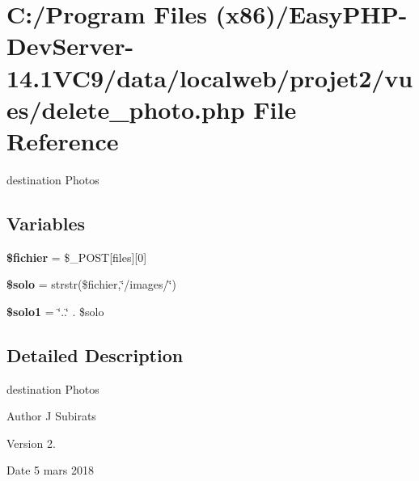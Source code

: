 \hypertarget{delete__photo_8php}{}\section{C\+:/\+Program Files (x86)/\+Easy\+P\+H\+P-\/\+Dev\+Server-\/14.1\+V\+C9/data/localweb/projet2/vues/delete\+\_\+photo.php File Reference}
\label{delete__photo_8php}


destination Photos  


\subsection*{Variables}
\begin{DoxyCompactItemize}
\item 
\mbox{\label{delete__photo_8php_a1cab83481bc861b32af8f093a199c35e}} 
{\bfseries \$fichier} = \$\+\_\+\+P\+O\+ST\mbox{[}\textquotesingle{}files\textquotesingle{}\mbox{]}\mbox{[}0\mbox{]}
\item 
\mbox{\label{delete__photo_8php_a79114ded601e158e0d9a84051042cc72}} 
{\bfseries \$solo} = strstr(\$fichier,\char`\"{}/images/\char`\"{})
\item 
\mbox{\label{delete__photo_8php_a1d69f98e4c5505cd976eaa44d885e954}} 
{\bfseries \$solo1} = \char`\"{}..\char`\"{} . \$solo
\end{DoxyCompactItemize}


\subsection{Detailed Description}
destination Photos 

\begin{DoxyAuthor}{Author}
J Subirats 
\end{DoxyAuthor}
\begin{DoxyVersion}{Version}
2. 
\end{DoxyVersion}
\begin{DoxyDate}{Date}
5 mars 2018 
\end{DoxyDate}
